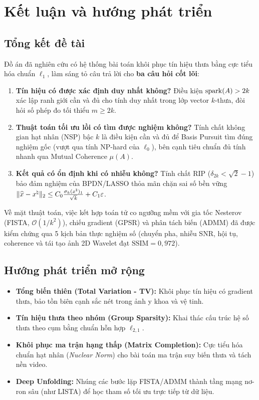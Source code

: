 \chapter*{Kết luận và hướng phát triển}

\section*{Tổng kết đề tài}
Đồ án đã nghiên cứu có hệ thống bài toán khôi phục tín hiệu thưa bằng cực tiểu hóa chuẩn $\ell_1$, làm sáng tỏ câu trả lời cho \textbf{ba câu hỏi cốt lõi}:
\begin{enumerate}
    \setlength{\itemsep}{2pt}\setlength{\parskip}{0pt}
    \item \textbf{Tín hiệu có được xác định duy nhất không?} Điều kiện $\operatorname{spark}(A) > 2k$ xác lập ranh giới cần và đủ cho tính duy nhất trong lớp vector $k$-thưa, đòi hỏi số phép đo tối thiểu $m \ge 2k$.
    \item \textbf{Thuật toán tối ưu lồi có tìm được nghiệm không?} Tính chất không gian hạt nhân (NSP) bậc $k$ là điều kiện cần và đủ để Basis Pursuit tìm đúng nghiệm gốc (vượt qua tính NP-hard của $\ell_0$), bên cạnh tiêu chuẩn đủ tính nhanh qua Mutual Coherence $\mu(A)$.
    \item \textbf{Kết quả có ổn định khi có nhiễu không?} Tính chất RIP ($\delta_{2k} < \sqrt{2} - 1$) bảo đảm nghiệm của BPDN/LASSO thỏa mãn chặn sai số bền vững $\|\widehat{x} - x^\natural\|_2 \le C_0 \frac{\sigma_k(x^\natural)_1}{\sqrt{k}} + C_1 \varepsilon$.
\end{enumerate}

Về mặt thuật toán, việc kết hợp toán tử co ngưỡng mềm với gia tốc Nesterov (FISTA, $\mathcal{O}(1/k^2)$), chiếu gradient (GPSR) và phân tách biến (ADMM) đã được kiểm chứng qua 5 kịch bản thực nghiệm số (chuyển pha, nhiễu SNR, hội tụ, coherence và tái tạo ảnh 2D Wavelet đạt $\mathrm{SSIM} = 0{,}972$).

\section*{Hướng phát triển mở rộng}
\begin{itemize}
    \setlength{\itemsep}{2pt}\setlength{\parskip}{0pt}
    \item \textbf{Tổng biến thiên (Total Variation - TV):} Khôi phục tín hiệu có gradient thưa, bảo tồn biên cạnh sắc nét trong ảnh y khoa và vệ tinh.
    \item \textbf{Tín hiệu thưa theo nhóm (Group Sparsity):} Khai thác cấu trúc hệ số thưa theo cụm bằng chuẩn hỗn hợp $\ell_{2,1}$.
    \item \textbf{Khôi phục ma trận hạng thấp (Matrix Completion):} Cực tiểu hóa chuẩn hạt nhân (\emph{Nuclear Norm}) cho bài toán ma trận suy biến thưa và tách nền video.
    \item \textbf{Deep Unfolding:} Nhúng các bước lặp FISTA/ADMM thành tầng mạng nơ-ron sâu (như LISTA) để học tham số tối ưu trực tiếp từ dữ liệu.
\end{itemize}